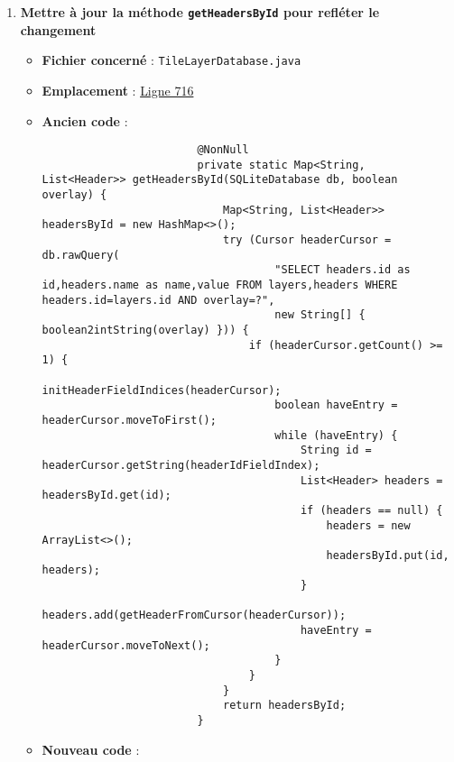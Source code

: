 \begin{enumerate}
    \item \textbf{Mettre à jour la méthode \texttt{getHeadersById} pour refléter le changement}
          \begin{itemize}
              \item \textbf{Fichier concerné} : \texttt{TileLayerDatabase.java}
              \item \textbf{Emplacement} :
                    \href{https://github.com/MarcusWolschon/osmeditor4android/blob/dcabe8084aa15f5551a37c990516bf73398af1bf/src/main/java/de/blau/android/resources/TileLayerDatabase.java#L716}{Ligne 716}
              \item \textbf{Ancien code} :
                    \begin{verbatim}
                        @NonNull
                        private static Map<String, List<Header>> getHeadersById(SQLiteDatabase db, boolean overlay) {
                            Map<String, List<Header>> headersById = new HashMap<>();
                            try (Cursor headerCursor = db.rawQuery(
                                    "SELECT headers.id as id,headers.name as name,value FROM layers,headers WHERE headers.id=layers.id AND overlay=?",
                                    new String[] { boolean2intString(overlay) })) {
                                if (headerCursor.getCount() >= 1) {
                                    initHeaderFieldIndices(headerCursor);
                                    boolean haveEntry = headerCursor.moveToFirst();
                                    while (haveEntry) {
                                        String id = headerCursor.getString(headerIdFieldIndex);
                                        List<Header> headers = headersById.get(id);
                                        if (headers == null) {
                                            headers = new ArrayList<>();
                                            headersById.put(id, headers);
                                        }
                                        headers.add(getHeaderFromCursor(headerCursor));
                                        haveEntry = headerCursor.moveToNext();
                                    }
                                }
                            }
                            return headersById;
                        }
                    \end{verbatim}
              \item \textbf{Nouveau code} :
                    \begin{verbatim}

\end{verbatim}
\end{itemize}
\end{enumerate}
